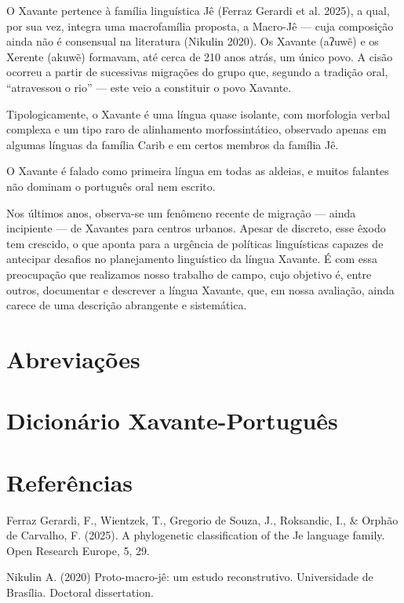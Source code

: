 \documentclass[12pt]{book}
\begin{document}
O Xavante pertence à família linguística Jê (Ferraz Gerardi et al. 2025), a qual, por sua vez, integra uma macrofamília proposta, a Macro-Jê — cuja composição ainda não é consensual na literatura (Nikulin 2020). Os Xavante (aʔuwẽ) e os Xerente (akuwẽ) formavam, até cerca de 210 anos atrás, um único povo. A cisão ocorreu a partir de sucessivas migrações do grupo que, segundo a tradição oral, “atravessou o rio” — este veio a constituir o povo Xavante.

Tipologicamente, o Xavante é uma língua quase isolante, com morfologia verbal complexa e um tipo raro de alinhamento morfossintático, observado apenas em algumas línguas da família Carib e em certos membros da família Jê.

O Xavante é falado como primeira língua em todas as aldeias, e muitos falantes não dominam o português oral nem escrito.

Nos últimos anos, observa-se um fenômeno recente de migração — ainda incipiente — de Xavantes para centros urbanos. Apesar de discreto, esse êxodo tem crescido, o que aponta para a urgência de políticas linguísticas capazes de antecipar desafios no planejamento linguístico da língua Xavante. É com essa preocupação que realizamos nosso trabalho de campo, cujo objetivo é, entre outros, documentar e descrever a língua Xavante, que, em nossa avaliação, ainda carece de uma descrição abrangente e sistemática.




\chapter*{Abreviações}


\frontmatter
\renewcommand{\contentsname}{Dicionário Xavante-Português} %
\tableofcontents

\mainmatter

\chapter*{Dicionário Xavante-Português}


\backmatter
\chapter*{Referências}

Ferraz Gerardi, F., Wientzek, T., Gregorio de Souza, J., Roksandic, I., \& Orphão de Carvalho, F. (2025). A phylogenetic classification of the Je language family. Open Research Europe, 5, 29.

Nikulin A. (2020) Proto-macro-jê: um estudo reconstrutivo. Universidade de Brasília. Doctoral dissertation.
\end{document}
